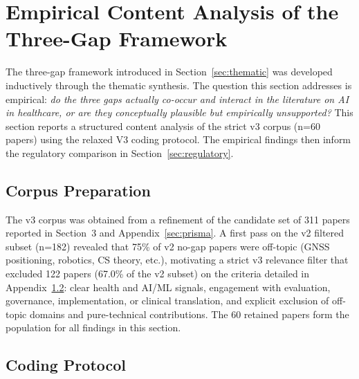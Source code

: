 
\section{Empirical Content Analysis of the Three-Gap Framework}
\label{sec:empirical}

The three-gap framework introduced in Section~\ref{sec:thematic} was
developed inductively through the thematic synthesis. The question this section addresses is
empirical: \textit{do the three gaps actually co-occur and interact in
the literature on AI in healthcare, or are they conceptually plausible
but empirically unsupported?} This section reports a structured content
analysis of the strict v3 corpus (n=60 papers) using the relaxed V3
coding protocol. The empirical findings then inform the regulatory
comparison in Section~\ref{sec:regulatory}.

\subsection{Corpus Preparation}
\label{sec:corpus_prep}

The v3 corpus was obtained from a refinement of the candidate set of
311 papers reported in Section~3 and Appendix~\ref{sec:prisma}. A
first pass on the v2 filtered subset (n=182) revealed that 75\% of v2
no-gap papers were off-topic (GNSS positioning, robotics, CS theory,
etc.), motivating a strict v3 relevance filter that excluded 122
papers (67.0\% of the v2 subset) on the criteria detailed in
Appendix~\ref{sec:coding_protocol}: clear health and AI/ML
signals, engagement with evaluation, governance, implementation, or
clinical translation, and explicit exclusion of off-topic domains and
pure-technical contributions. The 60 retained papers form the
population for all findings in this section.

\subsection{Coding Protocol}
\label{sec:coding_protocol}

